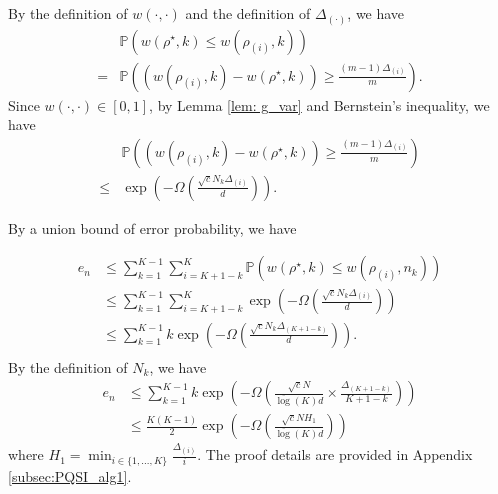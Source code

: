 \begin{proof-sketch}
    By the definition of $w(\cdot,\cdot)$ and the definition of $\Delta_{(\cdot)}$, we have
    \begin{equation*}
        \begin{aligned}
            & \mathbb{P}(w({\rho^\star,k}) \leq w({\rho_{(i)},k})) \\
            = & \mathbb{P}\left( (w(\rho_{(i)},k) -  w(\rho^\star,k))  \geq \frac{(m-1)\Delta_{(i)}}{m}\right).
        \end{aligned}
    \end{equation*}
    Since $w(\cdot,\cdot) \in [0,1]$, by Lemma \ref{lem: g_var} and Bernstein's inequality, we have
    \begin{equation}
        \begin{aligned}
            & \mathbb{P}\left( (w(\rho_{(i)},k) -  w(\rho^\star,k))  \geq \frac{(m-1)\Delta_{(i)}}{m}\right) \\
            \leq & \exp\left( -\Omega\left( \frac{\sqrt{c}N_k \Delta_{(i)}}{d}\right)\right).
        \end{aligned}
    \end{equation}

    By a union bound of error probability, we have 

    \begin{equation*} 
        \begin{aligned} 
            e_n & \leq \sum_{k=1}^{K-1}\sum_{i = K+1-k}^K \mathbb{P}(w({\rho^\star,k}) \leq w({\rho_{(i)},n_k})) \\
            & \leq \sum_{k=1}^{K-1}\sum_{i = K+1-k}^K \exp\left( - \Omega\left(\frac{\sqrt{c}N_k \Delta_{(i)}}{d}\right)\right) \\
            &  \leq \sum_{k=1}^{K-1} k \exp\left( -\Omega\left( \frac{\sqrt{c}N_k \Delta_{(K+1-k)}}{d}\right)\right). \\
        \end{aligned}
    \end{equation*}
    By the definition of $N_k$, we have
    \begin{equation*}
        \begin{aligned}
            e_n & \leq \sum_{k=1}^{K-1} k \exp\left( -\Omega\left(\frac{\sqrt{c}N}{\overline{\log}(K)d} \times\frac{\Delta_{(K+1-k)}}{K+1-k}\right)\right) \\
            & \leq \frac{K(K-1)}{2} \exp\left( -\Omega\left(\frac{\sqrt{c}NH_1}{\overline{\log}(K)d}\right)\right)
        \end{aligned}
    \end{equation*}
    where $H_1 = \min_{i \in \{1,...,K\}} \frac{\Delta_{(i)}}{i}$.
    The proof details are provided in Appendix \ref{subsec:PQSI_alg1}.
\end{proof-sketch}

